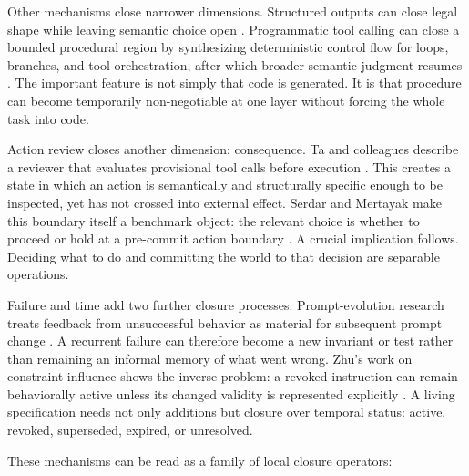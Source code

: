 \documentclass[11pt]{article}
\begin{document}
Other mechanisms close narrower dimensions. Structured outputs can close legal shape while leaving semantic choice open \parencite{openai2026structured}. Programmatic tool calling can close a bounded procedural region by synthesizing deterministic control flow for loops, branches, and tool orchestration, after which broader semantic judgment resumes \parencite{openai2026ptc}. The important feature is not simply that code is generated. It is that procedure can become temporarily non-negotiable at one layer without forcing the whole task into code.

Action review closes another dimension: consequence. Ta and colleagues describe a reviewer that evaluates provisional tool calls before execution \parencite{ta2026reinforced}. This creates a state in which an action is semantically and structurally specific enough to be inspected, yet has not crossed into external effect. Serdar and Mertayak make this boundary itself a benchmark object: the relevant choice is whether to proceed or hold at a pre-commit action boundary \parencite{serdar2026steerbench}. A crucial implication follows. Deciding what to do and committing the world to that decision are separable operations.

Failure and time add two further closure processes. Prompt-evolution research treats feedback from unsuccessful behavior as material for subsequent prompt change \parencite{pei2026scope}. A recurrent failure can therefore become a new invariant or test rather than remaining an informal memory of what went wrong. Zhu's work on constraint influence shows the inverse problem: a revoked instruction can remain behaviorally active unless its changed validity is represented explicitly \parencite{zhu2026deadtext}. A living specification needs not only additions but closure over temporal status: active, revoked, superseded, expired, or unresolved.

These mechanisms can be read as a family of local closure operators:
\end{document}
